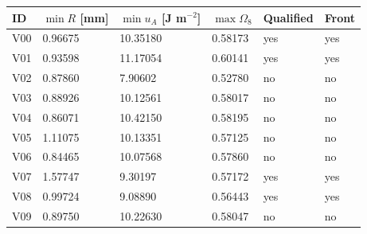 \begin{tabular}{llllll}
\toprule
ID & $\min R$ [mm] & $\min u_A$ [J m$^{-2}$] & $\max\Omega_8$ & Qualified & Front \\
\midrule
V00 & 0.96675 & 10.35180 & 0.58173 & yes & yes \\
V01 & 0.93598 & 11.17054 & 0.60141 & yes & yes \\
V02 & 0.87860 & 7.90602 & 0.52780 & no & no \\
V03 & 0.88926 & 10.12561 & 0.58017 & no & no \\
V04 & 0.86071 & 10.42150 & 0.58195 & no & no \\
V05 & 1.11075 & 10.13351 & 0.57125 & no & no \\
V06 & 0.84465 & 10.07568 & 0.57860 & no & no \\
V07 & 1.57747 & 9.30197 & 0.57172 & yes & yes \\
V08 & 0.99724 & 9.08890 & 0.56443 & yes & yes \\
V09 & 0.89750 & 10.22630 & 0.58047 & no & no \\
\bottomrule
\end{tabular}
